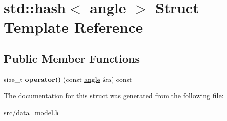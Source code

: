\hypertarget{structstd_1_1hash_3_01angle_01_4}{}\section{std\+:\+:hash$<$ angle $>$ Struct Template Reference}
\label{structstd_1_1hash_3_01angle_01_4}
\subsection*{Public Member Functions}
\begin{DoxyCompactItemize}
\item 
\mbox{\label{structstd_1_1hash_3_01angle_01_4_a545cf76d8119d6f602bbf0d28804bd87}} 
size\+\_\+t {\bfseries operator()} (const \hyperlink{structangle}{angle} \&a) const
\end{DoxyCompactItemize}


The documentation for this struct was generated from the following file\+:\begin{DoxyCompactItemize}
\item 
src/data\+\_\+model.\+h\end{DoxyCompactItemize}

